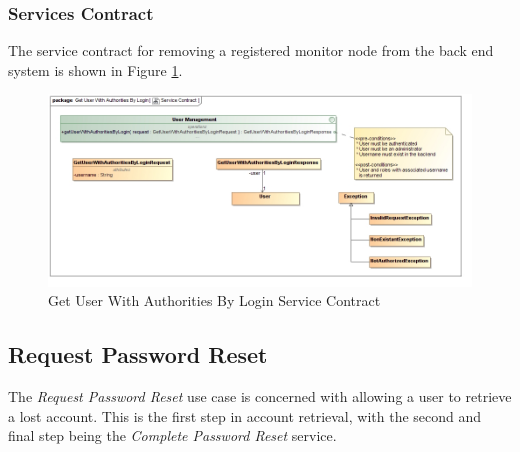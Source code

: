\subsubsection{Services Contract}
The service contract for removing a registered monitor node from the back end 
system is shown in Figure \ref{fig:getUserWithAuthoritiesByLoginServicesContract}.
\begin{figure}[H]
	\begin{center}
		\includegraphics[scale=0.4]{../Diagrams and Charts/User Management/Get User With Authorities By Login Service Contract.jpg}
		\caption{Get User With Authorities By Login Service Contract}
		\label{fig:getUserWithAuthoritiesByLoginServicesContract}
	\end{center}
\end{figure}



\subsection{Request Password Reset}
The \textit{Request Password Reset} use case is concerned with allowing a user
to retrieve a lost account. This is the first step in account retrieval, with the
second and final step being the \textit{Complete Password Reset} service.

